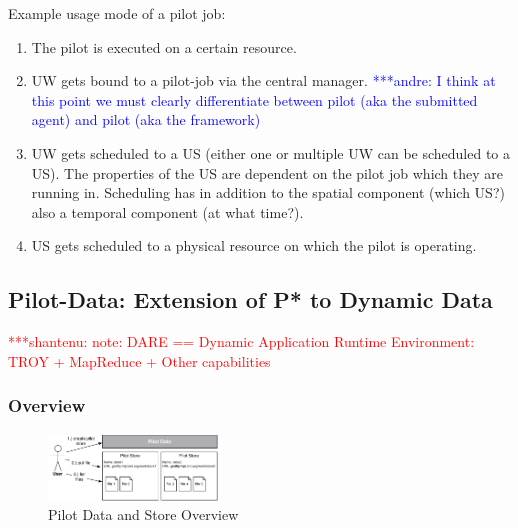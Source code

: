 \documentclass[conference,final]{IEEEtran}
\newcommand{\jhanote}[1]{ {\textcolor{red} { ***shantenu: #1 }}}
\newcommand{\alnote}[1]{ {\textcolor{blue} { ***andre: #1 }}}
\newcommand{\alnote}[1]{}
\newcommand{\jhanote}[1]{}
\begin{document}
\noindent
Example usage mode of a pilot job:
\begin{enumerate}
    \item The pilot is executed on a certain resource.
    \item UW gets bound to a pilot-job via the central manager. 
    \alnote{I think at this point we must 
    clearly differentiate between pilot (aka the submitted agent) and pilot (aka 
    the framework)}
    \item UW gets scheduled to a US  (either one or multiple UW can be 
     scheduled to a US). The properties of the US are dependent on the pilot job 
     which they are running in. Scheduling has in addition to the spatial 
     component (which US?) also a temporal component (at what time?).
    \item US gets scheduled to a physical resource on which the pilot is 
     operating.
\end{enumerate}



\subsection{Pilot-Data: Extension of P* to Dynamic Data}
\label{sec:pilot-data}


\jhanote{note: DARE == Dynamic Application Runtime Environment: TROY +
  MapReduce + Other capabilities}


\subsubsection{Overview}

\begin{figure}[t]
    \centering
        \includegraphics[width=0.4\textwidth]{figures/pilotstore.pdf}
    \caption{Pilot Data and Store Overview}
    \label{fig:figures_pilotstore}
\end{figure}
\end{document}
